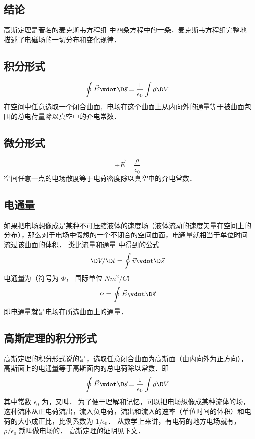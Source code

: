 
\subsection{结论}

高斯定理是著名的麦克斯韦方程组%
中四条方程中的一条．麦克斯韦方程组完整地描述了电磁场的一切分布和变化规律．

\subsection{积分形式}    
\begin{equation}
\oint {\vec E \vdot \D \vec s}  = \frac{1}{{{\epsilon_0}}}\int {\rho \D V} 
\end{equation}               
在空间中任意选取一个闭合曲面，电场在这个曲面上从内向外的通量等于被曲面包围的总电荷量除以真空中的介电常数．

\subsection{微分形式} 
\begin{equation}
\div \vec E = \frac{\rho }{{{\epsilon_0}}}
\end{equation}                      
空间任意一点的电场散度等于电荷密度除以真空中的介电常数．


\subsection{电通量}

如果把电场想像成是某种不可压缩液体的速度场（液体流动的速度矢量在空间上的分布），那么对于电场中假想的一个不闭合的空间曲面，电通量就相当于单位时间流过该曲面的体积．
类比流量和通量%
中得到的公式
\begin{equation}
\D V/\D t = \oint {\vec v \vdot \D \vec s} 
\end{equation} 
电通量为（符号为 $\Phi $， 国际单位 $N{m^2}/C$）
\begin{equation}
\Phi  = \oint {\vec E \vdot \D \vec s} 
\end{equation} 
即电通量就是电场在所选曲面上的通量．


\subsection{高斯定理的积分形式}

高斯定理的积分形式说的是，选取任意闭合曲面为高斯面（由内向外为正方向），高斯面上的电通量等于高斯面内的总电荷除以常数．即
\begin{equation}
\oint {\vec E \vdot \D \vec s}  = \frac{1}{{{\epsilon_0}}}\int {\rho  \D V} 
\end{equation} 
其中常数 ${\epsilon_0}$ 为，又叫．
为了便于理解和记忆，可以把电场想像成某种流体的场，这种流体从正电荷流出，流入负电荷，流出和流入的速率（单位时间的体积）和电荷的大小成正比，比例系数为 $1/{\epsilon_0}$． 从数学上来讲，有电荷的地方电场就有， $\rho /{\epsilon_0}$ 就叫做电场的． 高斯定理的证明见下文．


